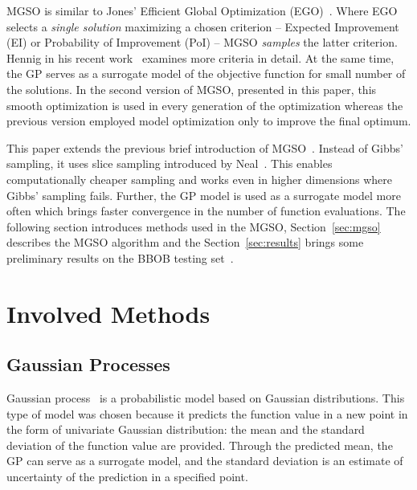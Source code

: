 \documentclass{itatnew}
\begin{document}
MGSO is similar to Jones' Efficient Global Optimization (EGO)~\cite{jones_efficient_1998}.
Where EGO selects a \emph{single solution} maximizing a chosen criterion -- Expected Improvement (EI) or Probability of Improvement (PoI) -- MGSO \emph{samples} the latter criterion. Hennig in his recent work~\cite{hennig_entropy_2012} examines more criteria in detail. 
At the same time, the GP serves as a surrogate model of the objective function for small number of the solutions. In the second version of MGSO, presented in this paper, this smooth optimization is used in every generation of the optimization whereas the previous version employed model optimization only to improve the final optimum.

This paper extends the previous brief introduction of MGSO~\cite{bajer_model_2013}. Instead of Gibbs' sampling, it uses slice sampling introduced by Neal~\cite{neal_slice_2003}. This enables computationally cheaper sampling and works even in higher dimensions where Gibbs' sampling fails. Further, the GP model is used as a surrogate model more often which brings faster convergence in the number of function evaluations. The following section introduces methods used in the MGSO, Section~\ref{sec:mgso} describes the MGSO algorithm and the Section~\ref{sec:results} brings some preliminary results on the BBOB testing set~\cite{hansen_real_2009}.


\section{Involved Methods}

\subsection{Gaussian Processes}

Gaussian process~\cite{rasmussen_gaussian_2006} is a probabilistic model based on Gaussian distributions. This type of model was chosen because it predicts the function value in a new point in the form of univariate Gaussian distribution: the mean and the standard deviation of the function value are provided. Through the predicted mean, the GP can serve as a surrogate model, and the standard deviation is an estimate of uncertainty of the prediction in a specified point.
\end{document}
